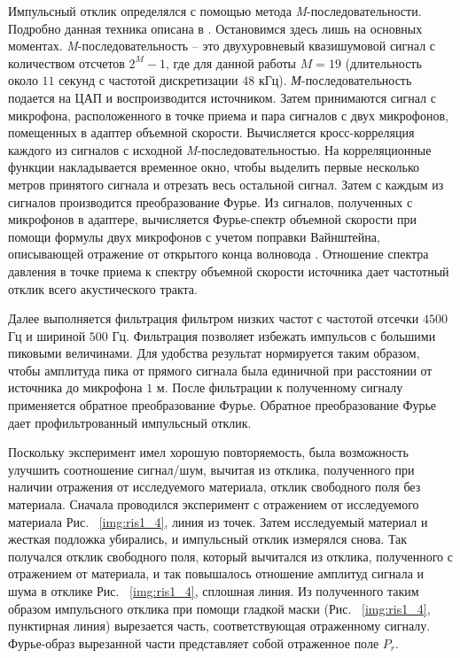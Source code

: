 Импульсный отклик определялся с помощью метода \textit{M}-последовательности. Подробно данная техника описана в \cite{ValyaevMLS}. Остановимся здесь лишь на основных моментах. \textit{M}-последовательность – это двухуровневый квазишумовой сигнал с количеством отсчетов $2^M - 1$, где для данной работы $M = 19$ (длительность около $11$ секунд с частотой дискретизации $48$ кГц). \textit{М}-последовательность подается на ЦАП и воспроизводится источником. Затем принимаются сигнал с микрофона, расположенного в точке приема и пара сигналов  с двух микрофонов, помещенных в адаптер объемной скорости. Вычисляется кросс-корреляция каждого из сигналов с исходной \textit{M}-последовательностью. На корреляционные функции накладывается временное окно, чтобы выделить первые несколько метров принятого сигнала и отрезать весь остальной сигнал. Затем с каждым из сигналов производится преобразование Фурье. Из сигналов, полученных с микрофонов в адаптере, вычисляется Фурье-спектр объемной скорости при помощи формулы двух микрофонов с учетом поправки Вайнштейна, описывающей отражение от открытого конца волновода \cite{Weinstein1966}. Отношение спектра давления в точке приема к спектру объемной скорости источника дает частотный отклик всего акустического тракта. 
	
Далее выполняется фильтрация фильтром низких частот с частотой отсечки $4500$ Гц и шириной $500$ Гц. Фильтрация позволяет избежать импульсов с большими пиковыми величинами. Для удобства результат нормируется таким образом, чтобы амплитуда пика от прямого сигнала была единичной при расстоянии от источника до микрофона $1$ м. После фильтрации к полученному сигналу применяется обратное преобразование Фурье. Обратное преобразование Фурье дает профильтрованный импульсный отклик. 

Поскольку эксперимент имел хорошую повторяемость, была возможность улучшить соотношение сигнал/шум, вычитая из отклика, полученного при наличии отражения от исследуемого материала, отклик свободного поля без материала. Сначала проводился эксперимент с отражением от исследуемого материала Рис. ~\ref{img:ris1_4}, линия из точек. Затем исследуемый материал и жесткая подложка убирались, и импульсный отклик измерялся снова. Так получался отклик свободного поля, который вычитался из отклика, полученного с отражением от материала, и так повышалось отношение амплитуд сигнала и шума в отклике Рис. ~\ref{img:ris1_4}, сплошная линия. Из полученного таким образом импульсного отклика при помощи гладкой маски (Рис. ~\ref{img:ris1_4}, пунктирная линия) вырезается часть, соответствующая отраженному сигналу. Фурье-образ вырезанной части представляет собой отраженное поле $P_r$.

